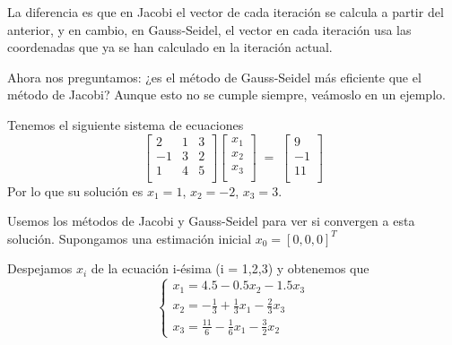 La diferencia es que en Jacobi el vector de cada iteración se calcula a partir del anterior, y en cambio, en Gauss-Seidel, el vector en cada iteración usa las coordenadas que ya se han calculado en la iteración actual.

Ahora nos preguntamos: ¿es el método de Gauss-Seidel más eficiente que el método de Jacobi? Aunque esto no se cumple siempre, veámoslo en un ejemplo.

\begin{ejemplo}
Tenemos el siguiente sistema de ecuaciones
\[ \begin{bmatrix}
2 & 1 & 3 \\
-1 & 3 & 2 \\
1 & 4 & 5 \\
\end{bmatrix}
\begin{bmatrix}
x_1 \\
x_2 \\
x_3 \\
\end{bmatrix}
\; = \;
\begin{bmatrix}
9 \\
-1 \\
11 \\
\end{bmatrix}
\]
Por lo que su solución es $x_1 = 1$, $x_2 = -2$, $x_3 = 3$.

Usemos los métodos de Jacobi y Gauss-Seidel para ver si convergen a esta solución. Supongamos una estimación inicial $x_0 = \left[ 0,0,0 \right] ^T$

Despejamos $x_i$ de la ecuación i-ésima (i = 1,2,3) y obtenemos que
\[ \left\{ \begin{array}{c}
x_1 = 4.5 - 0.5x_2 - 1.5x_3 \\
x_2 = - \frac{1}{3} + \frac{1}{3} x_1 - \frac{2}{3} x_3 \\
x_3 = \frac{11}{6} - \frac{1}{6} x_1 - \frac{3}{2} x_2
\end{array}
\right. \]


\end{ejemplo}
